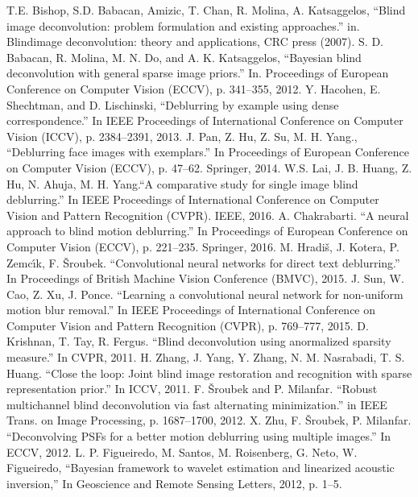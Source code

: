 \documentclass[conference,compsoc]{IEEEtran}
\begin{document}
\begin{thebibliography}{1}
		T.E. Bishop, S.D. Babacan, Amizic, T. Chan, R. Molina, A. Katsaggelos, ``Blind image deconvolution: problem formulation and existing approaches.'' in. Blindimage deconvolution: theory and applications,  CRC press (2007).
		S. D. Babacan, R. Molina, M. N. Do, and A. K. Katsaggelos, ``Bayesian blind deconvolution with general sparse image priors.'' In. Proceedings of European Conference on Computer Vision (ECCV), p. 341–355, 2012.
		Y. Hacohen, E. Shechtman, and D. Lischinski, ``Deblurring by example using dense correspondence.'' In IEEE Proceedings of International Conference on Computer Vision (ICCV), p. 2384–2391, 2013.
		J. Pan, Z. Hu, Z. Su, M. H. Yang., ``Deblurring face images with exemplars.'' In Proceedings of European Conference on Computer Vision (ECCV), p. 47–62. Springer, 2014.
		W.S. Lai, J. B. Huang, Z. Hu, N. Ahuja, M. H. Yang.``A comparative study for single image blind deblurring.'' In IEEE Proceedings of International Conference on Computer Vision and Pattern Recognition (CVPR). IEEE, 2016.
	A. Chakrabarti. ``A neural approach to blind motion deblurring.'' In Proceedings of European Conference on Computer Vision (ECCV), p. 221–235. Springer, 2016.
		M. Hradiš, J. Kotera, P. Zemcı́k, F. Šroubek. ``Convolutional neural networks for direct text deblurring.'' In Proceedings of British Machine Vision Conference (BMVC), 2015.
		J. Sun, W. Cao, Z. Xu, J. Ponce. ``Learning a convolutional neural network for non-uniform motion blur removal.'' In IEEE Proceedings of International Conference on Computer Vision and Pattern Recognition (CVPR), p. 769–777, 2015.
		D. Krishnan, T. Tay, R. Fergus. ``Blind deconvolution using anormalized sparsity measure.'' In CVPR, 2011.
		H. Zhang, J. Yang, Y. Zhang, N. M. Nasrabadi, T. S. Huang. ``Close the loop: Joint blind image restoration and recognition with sparse representation prior.'' In ICCV, 2011. 
		F. Šroubek and P. Milanfar. ``Robust multichannel blind deconvolution via fast alternating minimization.'' in IEEE Trans. on Image Processing, p. 1687–1700, 2012.
		X. Zhu, F. Šroubek, P. Milanfar. ``Deconvolving PSFs for a better motion deblurring using multiple images.'' In ECCV, 2012.
	L. P. Figueiredo, M. Santos, M. Roisenberg, G. Neto, W. Figueiredo, ``Bayesian framework to wavelet estimation and linearized acoustic inversion,'' In Geoscience and Remote Sensing Letters, 2012, p. 1–5.

\end{thebibliography}
\end{document}
